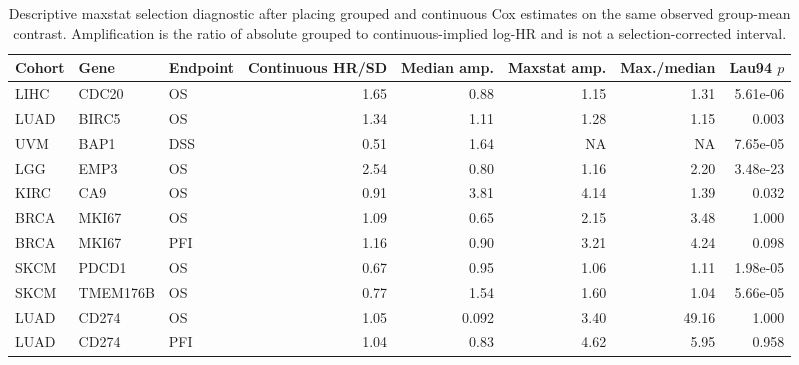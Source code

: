 \begin{table}[H]
\centering
\scriptsize
\caption{Descriptive maxstat selection diagnostic after placing grouped and continuous Cox estimates on the same observed group-mean contrast. Amplification is the ratio of absolute grouped to continuous-implied log-HR and is not a selection-corrected interval.}
\label{tab:maxstat-selection-diagnostic}
\begin{tabular}{lllrrrrr}
\toprule
Cohort & Gene & Endpoint & Continuous HR/SD & Median amp. & Maxstat amp. & Max./median & Lau94 $p$ \\
\midrule
LIHC & CDC20 & OS & 1.65 & 0.88 & 1.15 & 1.31 & 5.61e-06 \\
LUAD & BIRC5 & OS & 1.34 & 1.11 & 1.28 & 1.15 & 0.003 \\
UVM & BAP1 & DSS & 0.51 & 1.64 & NA & NA & 7.65e-05 \\
LGG & EMP3 & OS & 2.54 & 0.80 & 1.16 & 2.20 & 3.48e-23 \\
KIRC & CA9 & OS & 0.91 & 3.81 & 4.14 & 1.39 & 0.032 \\
BRCA & MKI67 & OS & 1.09 & 0.65 & 2.15 & 3.48 & 1.000 \\
BRCA & MKI67 & PFI & 1.16 & 0.90 & 3.21 & 4.24 & 0.098 \\
SKCM & PDCD1 & OS & 0.67 & 0.95 & 1.06 & 1.11 & 1.98e-05 \\
SKCM & TMEM176B & OS & 0.77 & 1.54 & 1.60 & 1.04 & 5.66e-05 \\
LUAD & CD274 & OS & 1.05 & 0.092 & 3.40 & 49.16 & 1.000 \\
LUAD & CD274 & PFI & 1.04 & 0.83 & 4.62 & 5.95 & 0.958 \\
\bottomrule
\end{tabular}
\end{table}
